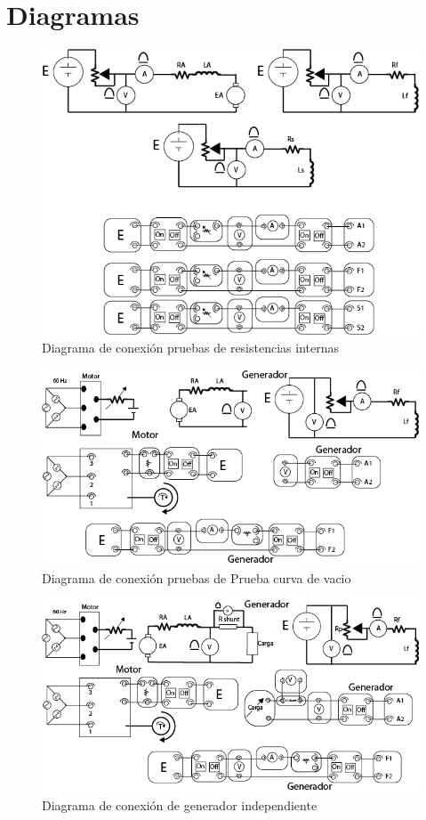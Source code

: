 \documentclass[11pt,letterpaper]{article}     %
\begin{document}
\section{Diagramas}
\begin{figure}[H]
    \centering
    \includegraphics[scale=0.5]{./recursos-Lab6/diagMedRes.png}
    \caption{Diagrama de conexión pruebas de resistencias internas}
    \label{fig:diagMedRes}
\end{figure}
\begin{figure}[H]
    \centering
    \includegraphics[scale=0.5]{./recursos-Lab6/diagMedCurvaVacio.png}
    \caption{Diagrama de conexión pruebas de Prueba curva de vacio}
    \label{fig:diagMedCurvaCaracteristica}
\end{figure}
\begin{figure}[H]
    \centering
    \includegraphics[scale=0.5]{./recursos-Lab6/diagGeneradorIndependiente.png}
    \caption{Diagrama de conexión de generador independiente}
    \label{fig:diagGeneradorIndependiente}
\end{figure}
\end{document}
